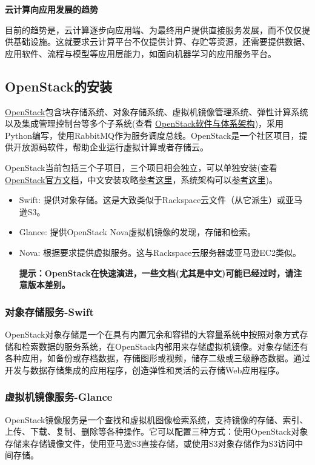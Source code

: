 \documentclass[letterpaper,10pt,english]{sphinxmanual}
\begin{document}
\textbf{云计算向应用发展的趋势}

目前的趋势是，云计算逐步向应用端、为最终用户提供直接服务发展，而不仅仅提供基础设施。这就要求云计算平台不仅提供计算、存贮等资源，还需要提供数据、应用软件、流程与模型等应用层能力，如面向机器学习的应用服务平台。


\subsection{OpenStack的安装}
\label{gispark_cloud:OpenStack_u7684_u5b89_u88c5}
\href{http://www.openstack.org/}{OpenStack}包含块存储系统、对象存储系统、虚拟机镜像管理系统、弹性计算系统以及集成管理控制台等多个子系统(查看
\href{http://www.openstack.org/software/}{OpenStack软件与体系架构})，采用Python编写，使用RabbitMQ作为服务调度总线。OpenStack是一个社区项目，提供开放源码软件，帮助企业运行虚拟计算或者存储云。

OpenStack当前包括三个子项目，三个项目相会独立，可以单独安装(查看\href{http://docs.openstack.org/index.html}{OpenStack官方文档}，中文安装攻略\href{http://bbs.chinaunix.net/thread-3563033-1-1.html}{参考这里}，系统架构可以\href{http://blog.csdn.net/anghlq/article/details/6543880}{参考这里})。
\begin{itemize}
\item {} 
Swift:
提供对象存储。这是大致类似于Rackspace云文件（从它派生）或亚马逊S3。

\item {} 
Glance: 提供OpenStack Nova虚拟机镜像的发现，存储和检索。

\item {} 
Nova: 根据要求提供虚拟服务。这与Rackspace云服务器或亚马逊EC2类似。

\textbf{提示：OpenStack在快速演进，一些文档(尤其是中文)可能已经过时，请注意版本差别。}

\end{itemize}


\subsubsection{对象存储服务-Swift}
\label{gispark_cloud:_u5bf9_u8c61_u5b58_u50a8_u670d_u52a1-Swift}
OpenStack对象存储是一个在具有内置冗余和容错的大容量系统中按照对象方式存储和检索数据的服务系统，在OpenStack内部用来存储虚拟机镜像。对象存储还有各种应用，如备份或存档数据，存储图形或视频，储存二级或三级静态数据。通过开发与数据存储集成的应用程序，创造弹性和灵活的云存储Web应用程序。


\subsubsection{虚拟机镜像服务-Glance}
\label{gispark_cloud:_u865a_u62df_u673a_u955c_u50cf_u670d_u52a1-Glance}
OpenStack镜像服务是一个查找和虚拟机图像检索系统，支持镜像的存储、索引、上传、下载、复制、删除等各种操作。它可以配置三种方式：使用OpenStack对象存储来存储镜像文件，使用亚马逊S3直接存储，或使用S3对象存储作为S3访问中间存储。
\end{document}
